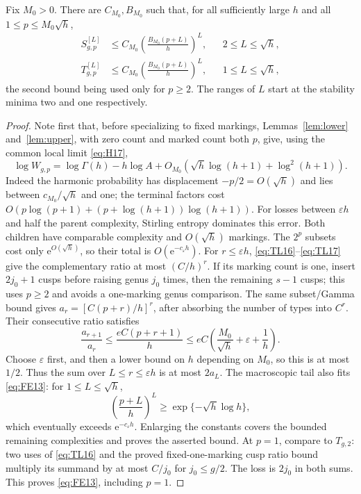 \begin{lemma}\label{lem:tails}
Fix $M_0>0$. There are $C_{M_0},B_{M_0}$ such that, for all sufficiently
large $h$ and all $1\le p\le M_0\sqrt h$,
\begin{equation}
 \begin{aligned}
 S_{g,p}^{[L]}&\le C_{M_0}\left(\frac{B_{M_0}(p+L)}h\right)^L,
                  &&2\le L\le\sqrt h,\\
 T_{g,p}^{[L]}&\le C_{M_0}\left(\frac{B_{M_0}(p+L)}h\right)^L,
                  &&1\le L\le\sqrt h,
 \end{aligned}
 \label{eq:FE13}
\end{equation}
the second bound being used only for $p\ge2$. The ranges of $L$ start at
the stability minima two and one respectively.
\end{lemma}

\begin{proof}
Note first that, before specializing to fixed markings,
Lemmas~\ref{lem:lower} and~\ref{lem:upper}, with zero count and marked count
both $p$, give, using the common local limit \eqref{eq:H17},
\[
 \log W_{g,p}=\log\Gamma(h)-h\log A
 +O_{M_0}(\sqrt h\log(h+1)+\log^2(h+1)).
\]
Indeed the harmonic probability has displacement $-p/2=O(\sqrt h)$
and lies between $c_{M_0}/\sqrt h$ and one; the terminal factors cost
$O(p\log(p+1)+(p+\log(h+1))\log(h+1))$.
For losses between $\varepsilon h$ and half the parent complexity,
Stirling entropy dominates this error. Both children have comparable
complexity and $O(\sqrt h)$ markings. The $2^p$ subsets cost only
$\mathrm{e}^{O(\sqrt h)}$, so their total is $O(\mathrm{e}^{-c_\varepsilon h})$.
For $r\le\varepsilon h$, \eqref{eq:TL16}--\eqref{eq:TL17} give the
complementary ratio at most $(C/h)^r$. If its marking count is one,
insert $2j_0+1$ cusps before raising genus $j_0$ times, then the
remaining $s-1$ cusps; this uses $p\ge2$ and avoids a one-marking
genus comparison. The same subset/Gamma bound gives
$a_r=[C(p+r)/h]^r$, after absorbing the number of types into $C^r$.
Their consecutive ratio satisfies
\[
 \frac{a_{r+1}}{a_r}
 \le \frac{eC(p+r+1)}h
 \le eC\left(\frac{M_0}{\sqrt h}+\varepsilon+\frac1h\right).
\]
Choose $\varepsilon$ first, and then a lower bound on $h$ depending on
$M_0$, so this is at most $1/2$. Thus the sum over $L\le r\le\varepsilon h$
is at most $2a_L$. The macroscopic tail also fits \eqref{eq:FE13}:
for $1\le L\le\sqrt h$,
\[
 \left(\frac{p+L}{h}\right)^L
 \ge \exp\{-\sqrt h\log h\},
\]
which eventually exceeds $\mathrm{e}^{-c_\varepsilon h}$. Enlarging the constants
covers the bounded remaining complexities and proves the asserted bound.
At $p=1$, compare to $T_{g,2}$: two uses of \eqref{eq:TL16} and the
proved fixed-one-marking cusp ratio bound multiply its summand by
at most $C/j_0$ for $j_0\le g/2$. The loss is $2j_0$ in both sums.
This proves \eqref{eq:FE13}, including $p=1$.
\end{proof}

